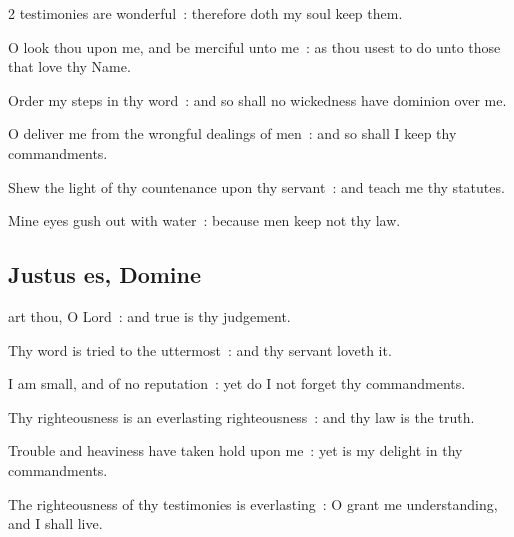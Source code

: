 \begin{multicols}{2}
 testimonies are wonderful~: therefore doth my soul keep them.\par
{}
O look thou upon me, and be merciful unto me~: as thou usest to do unto those that love thy Name.\par
{}Order my steps in thy word~: and so shall no wickedness have dominion over me.\par
{}O deliver me from the wrongful dealings of men~: and so shall I keep thy commandments.\par
{}Shew the light of thy countenance upon thy servant~: and teach me thy statutes.\par
{}Mine eyes gush out with water~: because men keep not thy law.\par


\subsection{Justus es, Domine}


 art thou, O Lord~: and true is thy judgement.\par
{}
Thy word is tried to the uttermost~: and thy servant loveth it.\par
{}I am small, and of no reputation~: yet do I not forget thy commandments.\par
{}Thy righteousness is an everlasting righteousness~: and thy law is the truth.\par
{}Trouble and heaviness have taken hold upon me~: yet is my delight in thy commandments.\par
{}The righteousness of thy testimonies is everlasting~: O grant me understanding, and I shall live.\par


\end{multicols}

